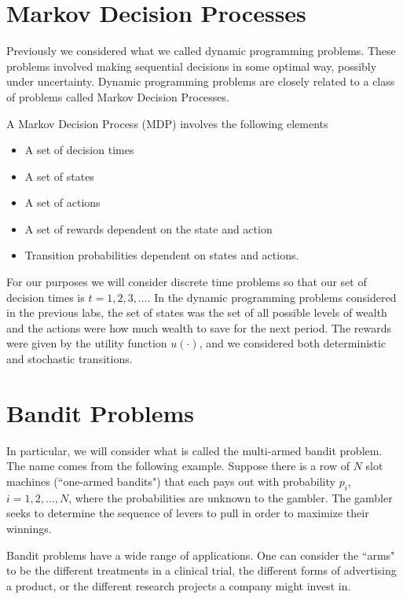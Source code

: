 
\section*{Markov Decision Processes}
Previously we considered what we called dynamic programming problems.  These problems involved making sequential decisions in some optimal way, possibly under uncertainty.  Dynamic programming problems are closely related to a class of problems called Markov Decision Processes.

A Markov Decision Process (MDP) involves the following elements

\begin{itemize}
\item   A set of decision times
\item   A set of states
\item   A set of actions
\item   A set of rewards dependent on the state and action
\item   Transition probabilities dependent on states and actions.
\end{itemize}

For our purposes we will consider discrete time problems so that our set of decision times is $t = 1,2,3,\ldots$.  In the dynamic programming problems considered in the previous labs, the set of states was the set of all possible levels of wealth and the actions were how much wealth to save for the next period.  The rewards were given by the utility function $u(\cdot)$, and we considered both deterministic and stochastic transitions.

\section*{Bandit Problems}
In particular, we will consider what is called the multi-armed bandit problem.  The name comes from the following example.  Suppose there is a row of $N$ slot machines (``one-armed bandits") that each pays out with probability $p_i$, $i= 1,2,\ldots,N$, where the probabilities are unknown to the gambler.  The gambler seeks to determine the sequence of levers to pull in order to maximize their winnings.

Bandit problems have a wide range of applications.  One can consider the ``arms" to be the different treatments in a clinical trial, the different forms of advertising a product, or the different research projects a company might invest in.

